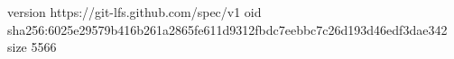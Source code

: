 version https://git-lfs.github.com/spec/v1
oid sha256:6025e29579b416b261a2865fe611d9312fbdc7eebbc7c26d193d46edf3dae342
size 5566
